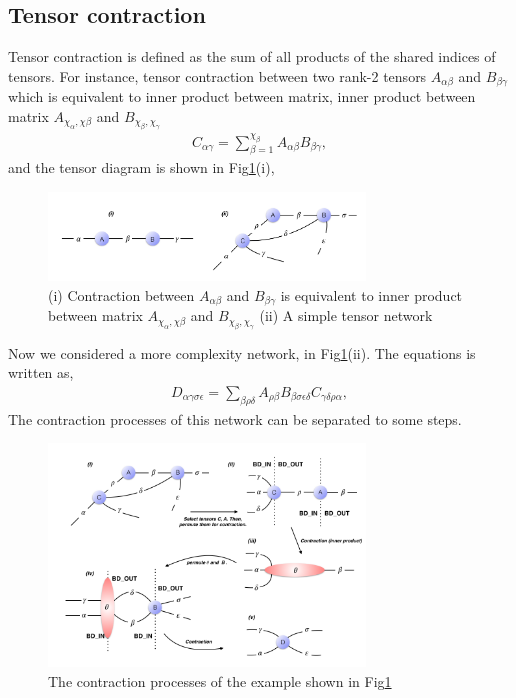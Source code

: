 \subsection{Tensor contraction}
Tensor contraction is defined as the sum of all products of the shared indices of tensors. For instance, tensor contraction between two rank-2 tensors $A_{\alpha \beta}$ and $B_{\beta \gamma}$ which is equivalent to inner product between matrix, inner product between matrix $A_{\chi_{\alpha}, \chi{\beta}}$ and $B_{\chi_{\beta}, \chi_{\gamma}}$
\begin{align}
	C_{\alpha \gamma}=\sum\limits_{\beta = 1}^{\chi_{\beta}}{A_{\alpha \beta}B_{\beta \gamma}},
\end{align}
and the tensor diagram is shown in Fig\ref{fig222}(i),
\begin{figure}[ht]
	\centering
	\includegraphics[width=0.75\textwidth]{figures/fig222.png}
	\caption[Simple examples of tensor diagrams.]{(i) Contraction between $A_{\alpha \beta}$ and $B_{\beta \gamma}$ is equivalent to inner product between matrix $A_{\chi_{\alpha}, \chi{\beta}}$ and $B_{\chi_{\beta}, \chi_{\gamma}}$ (ii) A simple tensor network}
	\label{fig222}
\end{figure}

Now we considered a more complexity network, in Fig\ref{fig222}(ii). The equations is written as, 
\begin{align}
	D_{\alpha \gamma \sigma \epsilon}=\sum_{\beta \rho \delta}{A_{\rho \beta}B_{\beta \sigma \epsilon \delta}C_{\gamma \delta \rho \alpha}},
\end{align}
The contraction processes of this network can be separated to some steps.
\begin{figure}[ht]
	\centering
	\includegraphics[width=0.75\textwidth]{figures/fig223.png}
	\caption[The contraction processes of the example network which shown in Fig\ref{fig222}(ii)]{ The contraction processes of the example shown in Fig\ref{fig222}}
	\label{fig223}
\end{figure}


